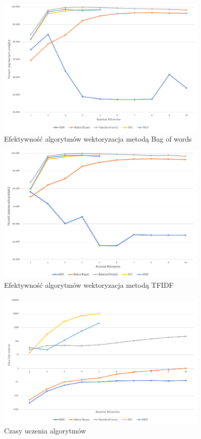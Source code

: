 \begin{figure}[h!]
    \centering
    \includegraphics[width=0.9\textwidth]{./Img/BOWAcc.png}
    \caption{Efektywność algorytmów wektoryzacja metodą Bag of words}
\end{figure}

\begin{figure}[h!]
    \centering
    \includegraphics[width=0.9\textwidth]{./Img/TFIDFAcc.png}
    \caption{Efektywność algorytmów wektoryzacja metodą TFIDF}
\end{figure}

\begin{figure}[h!]
    \centering
    \includegraphics[width=0.9\textwidth]{./Img/BOWLearn.png}
    \caption{Czasy uczenia algorytmów}
\end{figure}


